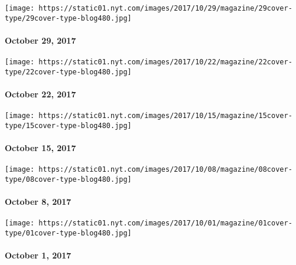 \href{https://www.nytimes.com/issue/magazine/2017/10/27/102917-issue}{}

\texttt{[image: https://static01.nyt.com/images/2017/10/29/magazine/29cover-type/29cover-type-blog480.jpg]}

\hypertarget{october-29-2017}{%
\paragraph{October 29, 2017}\label{october-29-2017}}

\href{https://www.nytimes.com/issue/magazine/2017/10/20/102217-issue}{}

\texttt{[image: https://static01.nyt.com/images/2017/10/22/magazine/22cover-type/22cover-type-blog480.jpg]}

\hypertarget{october-22-2017}{%
\paragraph{October 22, 2017}\label{october-22-2017}}

\href{https://www.nytimes.com/issue/magazine/2017/10/13/101517-issue}{}

\texttt{[image: https://static01.nyt.com/images/2017/10/15/magazine/15cover-type/15cover-type-blog480.jpg]}

\hypertarget{october-15-2017}{%
\paragraph{October 15, 2017}\label{october-15-2017}}

\href{https://www.nytimes.com/issue/magazine/2017/10/06/100817-issue}{}

\texttt{[image: https://static01.nyt.com/images/2017/10/08/magazine/08cover-type/08cover-type-blog480.jpg]}

\hypertarget{october-8-2017}{%
\paragraph{October 8, 2017}\label{october-8-2017}}

\href{https://www.nytimes.com/issue/magazine/2017/09/29/100117-issue}{}

\texttt{[image: https://static01.nyt.com/images/2017/10/01/magazine/01cover-type/01cover-type-blog480.jpg]}

\hypertarget{october-1-2017}{%
\paragraph{October 1, 2017}\label{october-1-2017}}

